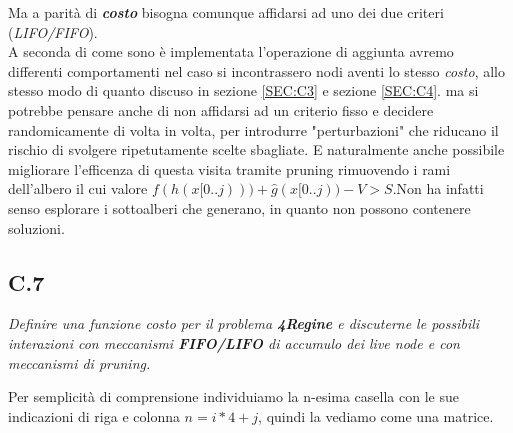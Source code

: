 \documentclass[a4paper]{article}
\newcommand{\imp}[1]{\textbf{\textit{#1}}}
\begin{document}
Ma a parità di \imp{costo} bisogna comunque affidarsi ad uno dei due criteri (\textit{LIFO/FIFO}).\\
A seconda di come sono è implementata l'operazione di aggiunta avremo differenti comportamenti nel caso si incontrassero nodi aventi lo stesso \textit{costo}, allo stesso modo di quanto discuso in sezione \ref{SEC:C3} e sezione \ref{SEC:C4}.
ma si potrebbe pensare anche di non affidarsi ad un criterio fisso e decidere randomicamente di volta in volta, per introdurre "perturbazioni" che riducano il rischio di svolgere ripetutamente scelte sbagliate.
E naturalmente anche possibile migliorare l'efficenza di questa visita tramite pruning rimuovendo i rami dell'albero il cui valore $ f(h(x[0..j))) + \hat g(x[0..j)) - V > S$.Non ha infatti senso esplorare i sottoalberi che generano, in quanto non possono contenere soluzioni.
\subsection{C.7}
\emph{Definire una funzione costo per il problema \textbf{4Regine} e discuterne le possibili interazioni con meccanismi \textbf{FIFO/LIFO} di accumulo dei live node e con meccanismi di pruning.}

Per semplicità di comprensione individuiamo la n-esima casella con le sue indicazioni di riga e colonna $n = i*4 + j$, quindi la vediamo come una matrice.
\end{document}
